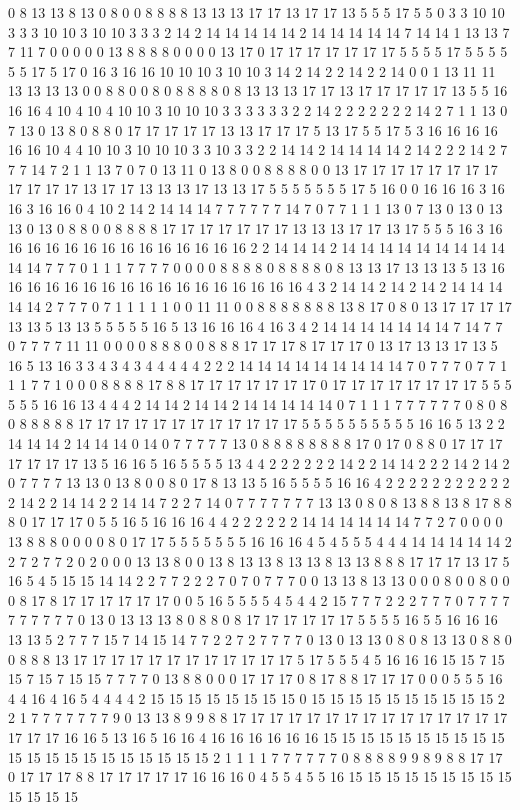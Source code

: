 0 8 13 13 8 13 0 8 0 0 8 8 8 8 13 13 13 17 17 13 17 17 13 5 5 5 17 5 5 0 3 3 10 10 3 3 3 10 10 3 10 10 3 3 3 2 14 2 14 14 14 14 14 2 14 14 14 14 14 7 14 14 1 13 13 7 7 11 7 0 0 0 0 0 13 8 8 8 8 0 0 0 0 13 17 0 17 17 17 17 17 17 17 5 5 5 5 17 5 5 5 5 5 5 17 5 17 0 16 3 16 16 10 10 10 3 10 10 3 14 2 14 2 2 14 2 2 14 0 0 1 13 11 11 13 13 13 13 0 0 8 8 0 0 8 0 8 8 8 8 0 8 13 13 13 17 17 13 17 17 17 17 17 13 5 5 16 16 16 4 10 4 10 4 10 10 3 10 10 10 3 3 3 3 3 3 2 2 14 2 2 2 2 2 2 2 14 2 7 1 1 13 0 7 13 0 13 8 0 8 8 0 17 17 17 17 17 13 13 17 17 17 5 13 17 5 5 17 5 3 16 16 16 16 16 16 10 4 4 10 10 3 10 10 10 3 3 10 3 3 2 2 14 14 2 14 14 14 14 2 14 2 2 2 14 2 7 7 7 14 7 2 1 1 13 7 0 7 0 13 11 0 13 8 0 0 8 8 8 8 0 0 13 17 17 17 17 17 17 17 17 17 17 17 17 13 17 17 13 13 13 17 13 13 17 5 5 5 5 5 5 5 17 5 16 0 0 16 16 16 3 16 16 3 16 16 0 4 10 2 14 2 14 14 14 7 7 7 7 7 7 14 7 0 7 7 1 1 1 13 0 7 13 0 13 0 13 13 0 13 0 8 8 0 0 8 8 8 8 17 17 17 17 17 17 17 13 13 13 17 17 13 17 5 5 5 16 3 16 16 16 16 16 16 16 16 16 16 16 16 16 16 2 2 14 14 14 2 14 14 14 14 14 14 14 14 14 14 14 7 7 7 0 1 1 1 7 7 7 7 0 0 0 0 8 8 8 8 0 8 8 8 8 0 8 13 13 17 13 13 13 5 13 16 16 16 16 16 16 16 16 16 16 16 16 16 16 16 16 16 4 3 2 14 14 2 14 2 14 2 14 14 14 14 14 2 7 7 7 0 7 1 1 1 1 1 0 0 11 11 0 0 8 8 8 8 8 8 8 13 8 17 0 8 0 13 17 17 17 17 13 13 5 13 13 5 5 5 5 5 16 5 13 16 16 16 4 16 3 4 2 14 14 14 14 14 14 14 7 14 7 7 0 7 7 7 7 11 11 0 0 0 0 8 8 8 0 0 8 8 8 17 17 17 8 17 17 17 0 13 17 13 13 17 13 5 16 5 13 16 3 3 4 3 4 3 4 4 4 4 4 2 2 2 14 14 14 14 14 14 14 14 14 7 0 7 7 7 0 7 7 1 1 1 7 7 1 0 0 0 8 8 8 8 17 8 8 17 17 17 17 17 17 17 0 17 17 17 17 17 17 17 17 5 5 5 5 5 5 16 16 13 4 4 4 2 14 14 2 14 14 2 14 14 14 14 14 0 7 1 1 1 7 7 7 7 7 7 0 8 0 8 0 8 8 8 8 8 17 17 17 17 17 17 17 17 17 17 17 17 5 5 5 5 5 5 5 5 5 5 16 16 5 13 2 2 14 14 14 2 14 14 14 0 14 0 7 7 7 7 7 13 0 8 8 8 8 8 8 8 8 17 0 17 0 8 8 0 17 17 17 17 17 17 17 13 5 16 16 5 16 5 5 5 5 13 4 4 2 2 2 2 2 2 14 2 2 14 14 2 2 2 14 2 14 2 0 7 7 7 7 13 13 0 13 8 0 0 8 0 17 8 13 13 5 16 5 5 5 5 16 16 4 2 2 2 2 2 2 2 2 2 2 2 2 14 2 2 14 14 2 2 14 14 7 2 2 7 14 0 7 7 7 7 7 7 7 13 13 0 8 0 8 13 8 8 13 8 17 8 8 8 0 17 17 17 0 5 5 16 5 16 16 16 4 4 2 2 2 2 2 2 14 14 14 14 14 14 7 7 2 7 0 0 0 0 13 8 8 8 0 0 0 0 8 0 17 17 5 5 5 5 5 5 5 16 16 16 4 5 4 5 5 5 4 4 4 14 14 14 14 14 2 2 7 2 7 7 2 0 2 0 0 0 13 13 8 0 0 13 8 13 13 8 13 13 8 13 13 8 8 8 17 17 17 13 17 5 16 5 4 5 15 15 14 14 2 2 7 7 2 2 2 7 0 7 0 7 7 7 0 0 13 13 8 13 13 0 0 0 8 0 0 8 0 0 0 8 17 8 17 17 17 17 17 17 0 0 5 16 5 5 5 5 4 5 4 4 2 15 7 7 7 2 2 2 7 7 7 0 7 7 7 7 7 7 7 7 7 7 0 13 0 13 13 13 8 0 8 8 0 8 17 17 17 17 17 17 5 5 5 5 16 5 5 16 16 16 13 13 5 2 7 7 7 15 7 14 15 14 7 7 2 2 7 2 7 7 7 7 0 13 0 13 13 0 8 0 8 13 13 0 8 8 0 0 8 8 8 13 17 17 17 17 17 17 17 17 17 17 17 17 5 17 5 5 5 4 5 16 16 16 15 15 7 15 15 7 15 7 15 15 7 7 7 7 0 13 8 8 0 0 0 17 17 17 0 8 17 8 8 17 17 17 0 0 0 5 5 5 16 4 4 16 4 16 5 4 4 4 4 2 15 15 15 15 15 15 15 15 0 15 15 15 15 15 15 15 15 15 15 2 2 1 7 7 7 7 7 7 7 9 0 13 13 8 9 9 8 8 17 17 17 17 17 17 17 17 17 17 17 17 17 17 17 17 17 17 16 16 5 13 16 5 16 16 4 16 16 16 16 16 16 15 15 15 15 15 15 15 15 15 15 15 15 15 15 15 15 15 15 15 15 15 2 1 1 1 1 7 7 7 7 7 7 0 8 8 8 8 9 9 8 9 8 8 17 17 0 17 17 17 8 8 17 17 17 17 17 16 16 16 0 4 5 5 4 5 5 16 15 15 15 15 15 15 15 15 15 15 15 15 15 